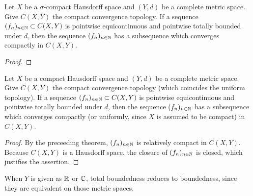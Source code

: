 \color{red}
\begin{cor}
    Let $X$ be a $\sigma$-compact Hausdorff space and $(Y, d)$ be a complete metric space.
    Give $C(X, Y)$ the compact convergence topology.
    If a sequence $(f_n)_{n\in{\mathbb{N}}}\subset C(X, Y)$ is pointwise equicontinuous and pointwise totally bounded under $d$, then the sequence $(f_n)_{n\in{\mathbb{N}}}$ has a subsequence which converges compactly in $C(X, Y)$.
\end{cor}
\begin{proof}
\end{proof}
\color{black}
\begin{cor}
    Let $X$ be a compact Hausdorff space and $(Y, d)$ be a complete metric space.
    Give $C(X, Y)$ the compact convergence topology (which coincides the uniform topology).
    If a sequence $(f_n)_{n\in{\mathbb{N}}}\subset C(X, Y)$ is pointwise equicontinuous and pointwise totally bounded under $d$, then the sequence $(f_n)_{n\in{\mathbb{N}}}$ has a subsequence which converges compactly (or uniformly, since $X$ is assumed to be compact) in $C(X, Y)$.
\end{cor}
\begin{proof}
    By the preceeding theorem, $(f_n)_{n\in{\mathbb{N}}}$ is relatively compact in $C(X, Y)$.
    Because $C(X, Y)$ is a Hausdorff space, the closure of $(f_n)_{n\in{\mathbb{N}}}$ is closed, which justifies the assertion.
\end{proof}
\begin{rmk}
    When $Y$ is given as ${\mathbb{R}}$ or ${\mathbb{C}}$, total boundedness reduces to boundedness, since they are equivalent on those metric spaces.
\end{rmk}
